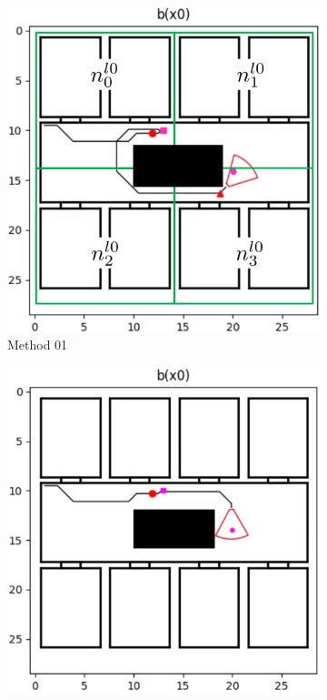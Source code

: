 \begin{figure}
    \centering
    \begin{subfigure}[b]{0.49\textwidth}
        \includegraphics[width=\textwidth]{Report/images/experiments/M1_envbig_problem2_nodes.png}
        \caption{Method 01}
        \label{subfig:problem2_M1}
    \end{subfigure}
    \begin{subfigure}[b]{0.49\textwidth}
         \includegraphics[width=\textwidth]{Report/images/experiments/M3_envbig_problem2_blackbox.png}

\end{subfigure}
\end{figure}
